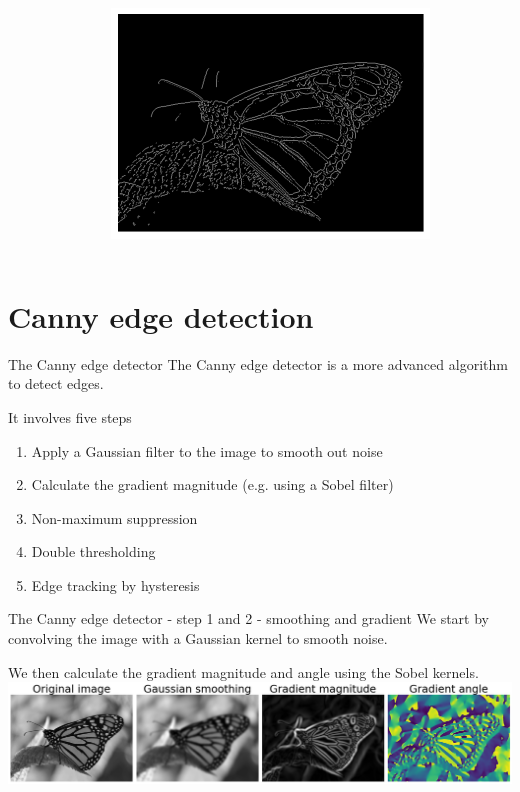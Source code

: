 \documentclass[9pt, aspectratio=169]{beamer}
\begin{document}
\begin{frame}
\begin{columns}
\begin{column}{.3\textwidth}
        \end{column}
        \pause
        \begin{column}{.4\textwidth}
            \includegraphics[width=.8\textwidth]{laplacian_of_gaussian_zero_crossing.png}
        \end{column}
    \end{columns}
\end{frame}

\section {Canny edge detection}
\begin{frame}
    {The Canny edge detector}
    The Canny edge detector is a more advanced algorithm to detect edges.

    It involves five steps

    \begin{enumerate}
        \item Apply a Gaussian filter to the image to smooth out noise
        \item Calculate the gradient magnitude (e.g. using a Sobel filter)
        \item Non-maximum suppression
        \item Double thresholding
        \item Edge tracking by hysteresis
    \end{enumerate}
\end{frame}

\begin{frame}
    {The Canny edge detector - step 1 and 2 - smoothing and gradient}
    We start by convolving the image with a Gaussian kernel to smooth noise.

    We then calculate the gradient magnitude and angle using the Sobel kernels.
    \centering
    \includegraphics[width=\textwidth]{canny_step1-2.png}
\end{frame}
\end{document}
